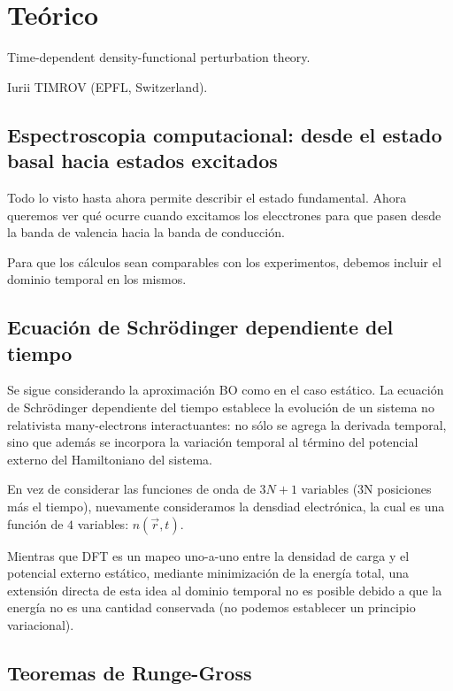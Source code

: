 \section{Teórico}

   Time-dependent density-functional perturbation theory.

   Iurii TIMROV (EPFL, Switzerland).

\subsection{Espectroscopia computacional: desde el estado basal hacia estados excitados}

  Todo lo visto hasta ahora permite describir el estado fundamental. Ahora queremos ver qué ocurre cuando excitamos los elecctrones para que pasen desde la banda de valencia hacia la banda de conducción.

  Para que los cálculos sean comparables con los experimentos, debemos incluir el dominio temporal en los mismos.

\subsection{Ecuación de Schrödinger dependiente del tiempo}

  Se sigue considerando la aproximación BO como en el caso estático. La ecuación de Schrödinger dependiente del tiempo establece la evolución de un sistema no relativista many-electrons interactuantes: no sólo se agrega la derivada temporal, sino que además se incorpora la variación temporal al término del potencial externo del Hamiltoniano del sistema.

  En vez de considerar las funciones de onda de $3N+1$ variables (3N posiciones más el tiempo), nuevamente consideramos la densdiad electrónica, la cual es una función de $4$ variables: $n (\vec{r}, t)$.

  Mientras que DFT es un mapeo uno-a-uno entre la densidad de carga y el potencial externo estático, mediante minimización de la energía total, una extensión directa de esta idea al dominio temporal no es posible debido a que la energía no es una cantidad conservada (no podemos establecer un principio variacional).

\subsection{Teoremas de Runge-Gross}

